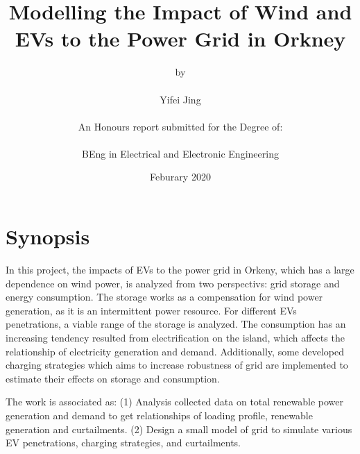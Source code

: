 \documentclass[12pt,a4paper]{report}
\begin{document}
    \onehalfspacing
    \title{\textbf{Modelling the Impact of Wind and EVs to the Power Grid in Orkney}}
    \author{by \\ \\ Yifei Jing \\ \\ An Honours report submitted for the Degree of: \\ \\
    BEng in Electrical and Electronic Engineering}
    \date{Feburary 2020}
    \maketitle
    \setlength\parindent{0pt}

    \cleardoublepage  
    \tableofcontents

    \cleardoublepage  
    \listoffigures

    \cleardoublepage  
    \listoftables
    \chapter*{Synopsis}
        In this project, the impacts of EVs to the power grid in Orkeny, which has a large dependence on wind power, is analyzed from two perspectivs: grid storage and energy consumption.
        The storage works as a compensation for wind power generation, as it is an intermittent power resource. For different EVs penetrations, a viable range of the storage is analyzed. The consumption has an increasing tendency resulted from electrification on the island, which affects the relationship of electricity generation and demand. Additionally,
        some developed charging strategies which aims to increase robustness of grid are implemented to estimate their effects on storage and consumption. 

        The work is associated as: (1) Analysis collected data on total renewable power generation and demand to get relationships of loading profile, renewable generation and curtailments.
        (2) Design a small model of grid to simulate various EV penetrations, charging strategies, and curtailments.
\end{document}

